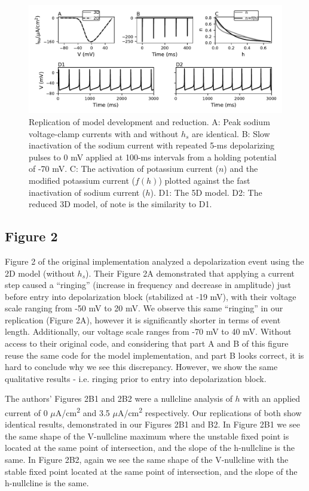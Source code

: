 \begin{figure}
	\centering
	\includegraphics[scale=0.7]{../figures/figure_1.pdf}
	\caption{Replication of model development and reduction. A: Peak sodium voltage-clamp currents with and without $h_s$ are identical. B: Slow inactivation of the sodium current with repeated 5-ms depolarizing pulses to 0 mV applied at 100-ms intervals from a holding potential of -70 mV. C: The activation of potassium current ($n$) and the modified potassium current ($f(h)$) plotted against the fast inactivation of sodium current ($h$). D1: The 5D model. D2: The reduced 3D model, of note is the similarity to D1.}
	\label{fig:1}
\end{figure}

\subsection{Figure 2}

Figure 2 of the original implementation analyzed a depolarization event using the 2D model (without $h_s$). Their Figure 2A demonstrated that applying a current step caused a ``ringing'' (increase in frequency and decrease in amplitude) just before entry into depolarization block (stabilized at -19 mV), with their voltage scale ranging from -50 mV to 20 mV. We observe this same ``ringing'' in our replication (Figure 2A), however it is significantly shorter in terms of event length. Additionally, our voltage scale ranges from -70 mV to 40 mV. Without access to their original code, and considering that part A and B of this figure reuse the same code for the model implementation, and part B looks correct, it is hard to conclude why we see this discrepancy. However, we show the same qualitative results - i.e. ringing prior to entry into depolarization block.

The authors' Figures 2B1 and 2B2 were a nullcline analysis of $h$ with an applied current of 0 $\mu$A/cm\textsuperscript{2} and 3.5 $\mu$A/cm\textsuperscript{2} respectively. Our replications of both show identical results, demonstrated in our Figures 2B1 and B2. In Figure 2B1 we see the same shape of the V-nullcline maximum where the unstable fixed point is located at the same point of intersection, and the slope of the h-nullcline is the same. In Figure 2B2, again we see the same shape of the V-nullcline with the stable fixed point located at the same point of intersection, and the slope of the h-nullcline is the same.

